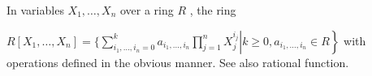 In variables  $ X_1, \ldots,X_n $  over a ring
 $ R $ , the ring
\par
 $ R [ X_1, \ldots,X_n ]=  \left .\left. \{ \sum_{i_1 , \ldots,i_n =0 }^k
a_{i_1 , \ldots,i_n} \prod _{j=1}^n X_j ^{i_j} \right | k \geq 0, 
 a_{i_1 , \ldots ,  i_n} \in R \right \} $ with operations defined in the obvious manner.
See also rational function.